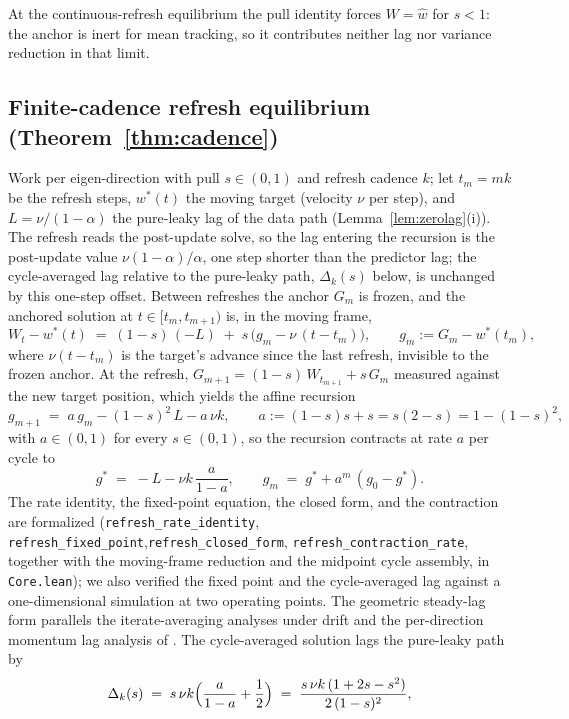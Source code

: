 At the continuous-refresh equilibrium the pull identity forces $W = \widehat w$ for $s < 1$: the anchor is inert for mean tracking, so it contributes neither lag nor variance reduction in that limit.

\subsection{Finite-cadence refresh equilibrium (Theorem~\ref{thm:cadence})}
\label{app:cadence}

Work per eigen-direction with pull $s \in (0,1)$ and refresh cadence $k$; let $t_m = mk$ be the refresh steps, $w^*(t)$ the moving target (velocity $\nu$ per step), and $L = \nu/(1-\alpha)$ the pure-leaky lag of the data path (Lemma~\ref{lem:zerolag}(i)). The refresh reads the post-update solve, so the lag entering the recursion is the post-update value $\nu(1-\alpha)/\alpha$, one step shorter than the predictor lag; the cycle-averaged lag relative to the pure-leaky path, $\Delta_k(s)$ below, is unchanged by this one-step offset.
Between refreshes the anchor $G_m$ is frozen, and the anchored solution at $t \in [t_m, t_{m+1})$ is, in the moving frame,
\[
  W_t - w^*(t) \;=\; (1-s)\,(-L) \;+\; s\,\bigl(g_m - \nu\,(t - t_m)\bigr),
  \qquad g_m := G_m - w^*(t_m),
\]
where $\nu (t - t_m)$ is the target's advance since the last refresh, invisible to the frozen anchor.
At the refresh, $G_{m+1} = (1-s)\,W_{t_{m+1}} + s\,G_m$ measured against the new target position, which yields the affine recursion
\[
  g_{m+1} \;=\; a\,g_m - (1-s)^2\,L - a\,\nu k,
  \qquad a := (1-s)s + s = s(2-s) = 1 - (1-s)^2,
\]
with $a \in (0,1)$ for every $s \in (0,1)$, so the recursion contracts at rate $a$ per cycle to
\[
  g^* \;=\; -L - \nu k\,\frac{a}{1-a},
  \qquad
  g_m \;=\; g^* + a^m\,(g_0 - g^*).
\]
The rate identity, the fixed-point equation, the closed form, and the contraction are formalized (\texttt{refresh\_rate\_identity}, \texttt{refresh\_fixed\_point},\newline\texttt{refresh\_closed\_form}, \texttt{refresh\_contraction\_rate}, together with the moving-frame reduction and the midpoint cycle assembly, in \texttt{Core.lean}); we also verified the fixed point and the cycle-averaged lag against a one-dimensional simulation at two operating points.
The geometric steady-lag form parallels the iterate-averaging analyses under drift \citep{polyak1992,cutler2023} and the per-direction momentum lag analysis of \citet{hong2026}.
The cycle-averaged solution lags the pure-leaky path by
\[
  \Delta_k(s) \;=\; s\,\nu k \Bigl(\frac{a}{1-a} + \frac{1}{2}\Bigr)
  \;=\; \frac{s\,\nu k\,(1 + 2s - s^2)}{2\,(1-s)^2},
\]
